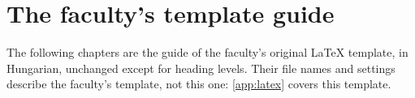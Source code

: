 \chapter*{The faculty's template guide}
The following chapters are the guide of the faculty's original \LaTeX{} template, in Hungarian, unchanged except for heading levels. Their file names and settings describe the faculty's template, not this one: \cref{app:latex} covers this template.
